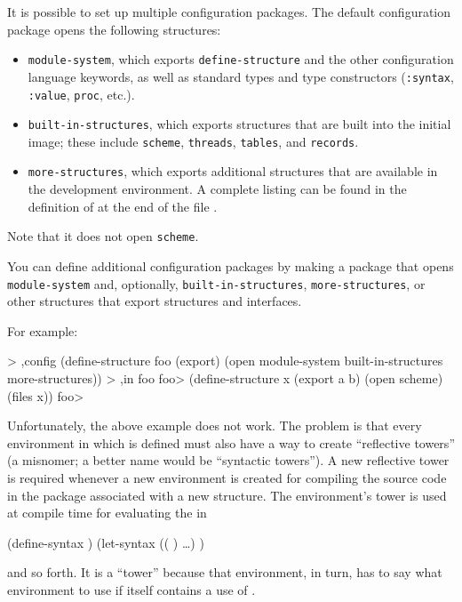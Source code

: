 It is possible to set up multiple configuration packages.  The default
configuration package opens the following structures:
\begin{itemize}
\item {\tt module-system}, which exports {\tt define-structure} and the
      other configuration language keywords, as well as standard types
      and type constructors ({\tt :syntax}, {\tt :value}, {\tt proc}, etc.).
\item {\tt built-in-structures}, which exports structures that are
      built into the initial \hack{} image; these include
      {\tt scheme}, {\tt threads}, {\tt tables}, and {\tt records}.
\item {\tt more-structures}, which exports additional structures that
      are available in the development environment. 
      A complete listing
      can be found in the definition of 
      at the end of the file .
\end{itemize}
Note that it does not open {\tt scheme}.

You can define additional configuration packages by making a package
 that opens {\tt module-\ok{}system} and, optionally,
 {\tt built-in-\ok{}structures},
 {\tt more-\ok{}structures}, or other structures that
 export structures and interfaces.

For example:
\begin{example}
> ,config (define-structure foo (export)
            (open module-system
                  built-in-structures
                  more-structures))
> ,in foo
foo> (define-structure x (export a b)
       (open scheme)
       (files x))
foo> 
\end{example}

Unfortunately, the above example does not work.
The problem is that every environment in which
  is defined must also have a way to
 create ``reflective towers'' (a misnomer; a better name would be
 ``syntactic towers'').
A new reflective tower is required whenever a new environment is created for
 compiling the source code in the package associated with a new structure.
The environment's tower is used at compile time for
 evaluating the  in
\begin{example}
(define-syntax  )
(let-syntax (( ) \ldots) )
\end{example}
 and so forth.
It is a ``tower'' because that environment, in turn, has to say what environment
 to use if  itself contains a use of .

